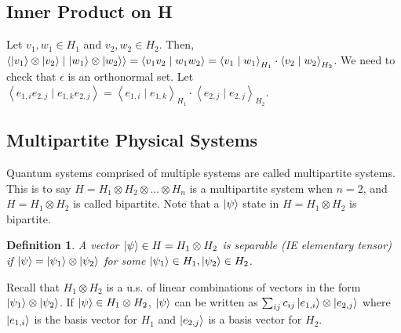 \documentclass[12pt]{article}
\theoremstyle{plain}
\theoremstyle{nonumberplain}
\theoremstyle{plain}
\newtheorem{definition}[lemma]{Definition}
\theoremstyle{nonumberplain}
\newcommand\1{{\bf 1}}
\newcommand{\<}{\left\langle}
\renewcommand{\>}{\right\rangle}
\newcommand{\inp}[2]{\left\langle#1\mid #2\right\rangle} %
\begin{document}

\subsection{Inner Product on H}
Let $v_1, w_1\in H_1$ and $v_2, w_2\in H_2$. Then, $\inp{\ket{v_1}\otimes\ket{v_2}}{\ket{w_1}\otimes\ket{w_2}}=\inp{v_1v_2}{w_1w_2}=\inp{v_1}{w_1}_{H_1}\cdot\inp{v_2}{w_2}_{H_2}$. We need to check that $\epsilon$ is an orthonormal set. Let $\inp{e_{1,i}e_{2,j}}{e_{1,k}e_{2,j}}=\inp{e_{1,i}}{e_{1,k}}_{H_1}\cdot\inp{e_{2,j}}{e_{2,j}}_{H_2}$.


\subsection{Multipartite Physical Systems}
Quantum systems comprised of multiple systems are called multipartite systems. This is to say $H=H_1\otimes H_2 \otimes ... \otimes H_n$ is a multipartite system when $n=2$, and $H=H_1\otimes H_2$ is called bipartite. Note that a $\ket{\psi}$ state in $H=H_1\otimes H_2$ is bipartite.
\begin{definition}
A vector $\ket{\psi}\in H=H_1\otimes H_2$ is separable (IE elementary tensor) if $\ket{\psi}=\ket{\psi_1}\otimes \ket{\psi_2}$ for some $\ket{\psi_1}\in H_1,\ket{\psi_2}\in H_2$.
\end{definition}
Recall that $H_1\otimes H_2$ is a u.s. of linear combinations of vectors in the form $\ket{\psi_1}\otimes \ket{\psi_2}$. If $\ket{\psi}\in H_1\otimes H_2$, $\ket{\psi}$ can be written as $\sum_{ij}c_{ij}\ket{e_{1,i}}\otimes\ket{e_{2,j}}$ where $\ket{e_{1,i}}$ is the basis vector for $H_1$ and $\ket{e_{2,j}}$ is a basis vector for $H_2$.
\end{document}
